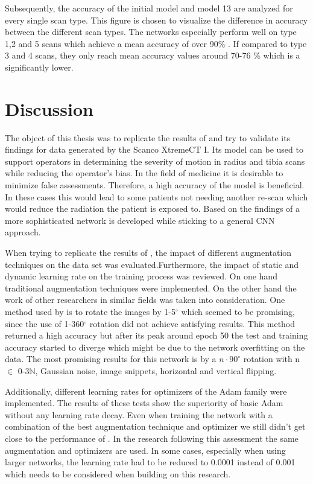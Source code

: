 \documentclass[
a4paper, 
12pt,
grayscalebody, %
abstract=on,
twoside, BCOR10mm, 12pt, DIV13,headinclude, footexclude, final, abstracton, openright
]{ibireprt}
\numberwithin{equation}{chapter}
\numberwithin{table}{chapter}
\numberwithin{figure}{chapter}
\numberwithin{algorithm}{chapter}
\numberwithin{example}{chapter}
\numberwithin{example}{chapter}
\begin{document}
Subsequently, the accuracy of the initial model and model 13 are analyzed for every single scan type. This figure is chosen to visualize the difference in accuracy between the different scan types. The networks especially perform well on type 1,2 and 5 scans which achieve a mean accuracy of over 90\% . If compared to type 3 and 4 scans, they only reach mean accuracy values around 70-76 \% which is a significantly lower.

\chapter{Discussion}

The object of this thesis was to replicate the results of \cite{Walle2023} and try to validate its findings for data generated by the Scanco XtremeCT I. Its model can be used to support operators in determining the severity of motion in radius and tibia scans while reducing the operator's bias. In the field of medicine it is desirable to minimize false assessments. Therefore, a high accuracy of the model is beneficial. In these cases this would lead to some patients not needing another re-scan which would reduce the radiation the patient is exposed to. Based on the findings  of \cite{Walle2023} a more sophisticated network is developed while sticking to a general CNN approach. 

When trying to replicate the results of \cite{Walle2023}, the impact of different augmentation techniques on the data set was evaluated.Furthermore, the impact of static and dynamic learning rate on the training process was reviewed. On one hand  traditional augmentation techniques were implemented. On the other hand the work of other researchers in similar fields was taken into consideration. One method used by \cite{Zhang2020} is to rotate the images by 1-5$^{\circ}$ which seemed to be promising, since the use of 1-360$^{\circ}$ rotation did not achieve satisfying results. This method returned a high accuracy but after its peak around epoch 50 the test and training accuracy started to diverge which might be due to the network overfitting on the data. The most promising results for this network is by a $ n \cdot 90^{\circ} $ rotation with n $\in$ {0-3}$\mathbb{N}$, Gaussian noise, image snippets, horizontal and vertical flipping. 

Additionally, different learning rates for optimizers of the Adam family were implemented. The results of these tests show the superiority of basic Adam without any learning rate decay. Even when training the network with a combination of the best augmentation technique and optimizer we still didn't get close to the performance of \cite{Walle2023}. In the research following this assessment the same augmentation and optimizers are used. In some cases, especially when using larger networks, the learning rate had to be reduced to 0.0001 instead of 0.001 which needs to be considered when building on this research.
\end{document}
